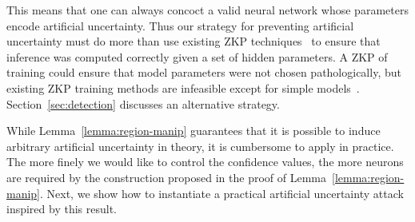 This means that one can always concoct a valid neural network whose parameters encode artificial uncertainty. Thus our strategy for preventing artificial uncertainty must do more than use existing ZKP techniques~\cite{weng2021mystique,sun2024zkllm} to ensure that inference was computed correctly given a set of hidden parameters. A ZKP of training could ensure that model parameters were not chosen pathologically, but existing ZKP training methods are infeasible except for simple models~\cite{garg2023experimenting}. Section~\ref{sec:detection} discusses an alternative strategy.

While Lemma~\ref{lemma:region-manip} guarantees that it is possible to induce arbitrary artificial uncertainty in theory, it is cumbersome to apply in practice. The more finely we would like to control the confidence values, the more neurons are required by the construction proposed in the proof of Lemma~\ref{lemma:region-manip}. Next, we show how to instantiate a practical artificial uncertainty attack inspired by this result. 







